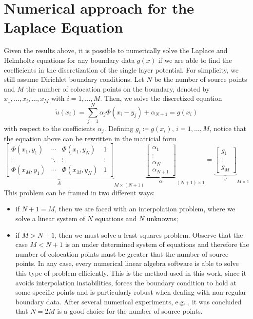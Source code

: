 \section{Numerical approach for the Laplace Equation}\label{n_a_mfs_lap}
Given the results above, it is possible to numerically solve the Laplace and Helmholtz equations for any boundary data \(g(x)\) if we are able to find the coefficients in the discretization of the single layer potential. For simplicity, we still assume Dirichlet boundary conditions. Let \(N\) be the number of source points and \(M\) the number of colocation points on the boundary, denoted by \(x_1,\dots,x_i,\dots,x_M\) with \(i=1,\dots,M\). Then, we solve the discretized equation
\[
    \tilde{u}(x_i) = \sum_{j=1}^{N} \alpha_j \Phi(x_i-y_j) + \alpha_{N+1} = g(x_i)    
\]
with respect to the coefficients \(\alpha_j\). Defining \(g_i \coloneq g(x_i), \, i=1,\dots,M\), notice that the equation above can be rewritten in the matricial form
\begin{equation}\label{mfs_m_system}
    {\underbrace{\begin{bmatrix}
        \Phi(x_1, y_1) & \cdots & \Phi(x_1, y_N) & 1 \\
        \vdots & \ddots & \vdots & \vdots\\
        \Phi(x_M, y_1) & \cdots & \Phi(x_M, y_N) & 1
    \end{bmatrix}}_{A}}_{M\times (N+1)}
    {\underbrace{\begin{bmatrix}
        \alpha_1\\
        \vdots\\
        \alpha_N\\
        \alpha_{N+1}
    \end{bmatrix}}_\alpha}_{(N+1)\times 1}
    =
    {\underbrace{\begin{bmatrix}
        g_1\\
        \vdots\\
        g_M
    \end{bmatrix}}_g}_{M\times 1}
\end{equation}
This problem can be framed in two different ways:
\begin{itemize}
    \item if \(N+1=M\), then we are faced with an interpolation problem, where we solve a linear system of \(N\) equations and \(N\) unknowns;
    \item if \(M > N+1\), then we must solve a least-squares problem. Observe that the case \(M < N+1\) is an under determined system of equations and therefore the number of colocation points must be greater that the number of source points. In any case, every numerical linear algebra software is able to solve this type of problem efficiently. This is the method used in this work, since it avoids interpolation instabilities, forces the boundary condition to hold at some specific points and is particularly robust when dealing with non-regular boundary data.  After several numerical experiments, e.g. \cite{alves2009choice}, it was concluded that \(N=2M\) is a good choice for the number of source points.
\end{itemize}

